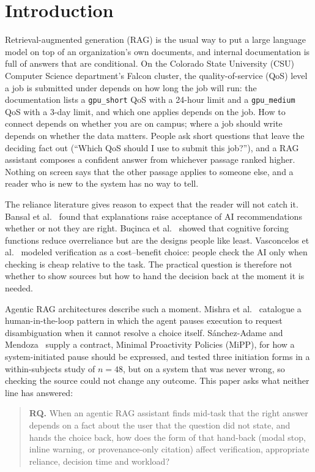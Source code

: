 \documentclass[manuscript,review]{acmart}
\begin{document}
\section{Introduction}
\label{sec:intro}

Retrieval-augmented generation (RAG) is the usual way to put a large
language model on top of an organization's own documents, and internal
documentation is full of answers that are conditional. On the Colorado
State University (CSU) Computer Science department's Falcon cluster, the
quality-of-service (QoS) level a job is submitted under depends on how long
the job will run: the documentation lists a \texttt{gpu\_short} QoS with a
24-hour limit and a \texttt{gpu\_medium} QoS with a 3-day limit, and which
one applies depends on the job. How to connect depends on whether you are
on campus; where a job should write depends on whether the data matters.
People ask short questions that leave the deciding fact out (``Which QoS
should I use to submit this job?''), and a RAG assistant composes a
confident answer from whichever passage ranked higher. Nothing on screen
says that the other passage applies to someone else, and a reader who is
new to the system has no way to tell.

The reliance literature gives reason to expect that the reader will not
catch it. Bansal et al.~\cite{bansal2021} found that explanations raise
acceptance of AI recommendations whether or not they are right.
Bu\c{c}inca et al.~\cite{bucinca2021} showed that cognitive forcing
functions reduce overreliance but are the designs people like least.
Vasconcelos et al.~\cite{vasconcelos2023} modeled verification as a
cost--benefit choice: people check the AI only when checking is cheap
relative to the task. The practical question is therefore not whether to
show sources but how to hand the decision back at the moment it is needed.

Agentic RAG architectures describe such a moment. Mishra et
al.~\cite{mishra2026} catalogue a human-in-the-loop pattern in which the
agent pauses execution to request disambiguation when it cannot resolve a
choice itself. S\'anchez-Adame and Mendoza~\cite{sanchezadame2026} supply
a contract, Minimal Proactivity Policies (MiPP), for how a system-initiated
pause should be expressed, and tested three initiation forms in a
within-subjects study of $n{=}48$, but on a system that was never wrong,
so checking the source could not change any outcome. This paper asks what
neither line has answered:

\begin{quote}
\textbf{RQ.} When an agentic RAG assistant finds mid-task that the right
answer depends on a fact about the user that the question did not state,
and hands the choice back, how does the form of that hand-back (modal
stop, inline warning, or provenance-only citation) affect verification,
appropriate reliance, decision time and workload?
\end{quote}
\end{document}

